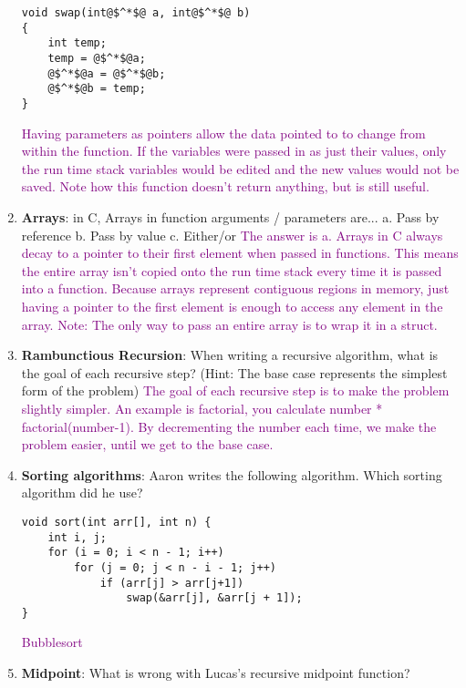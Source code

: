 \documentclass{article}
\begin{document}
\begin{enumerate}[label=(\alph*)]
    \begin{lstlisting}[style=CStyle]
void swap(int@$^*$@ a, int@$^*$@ b)
{
    int temp;
    temp = @$^*$@a;
    @$^*$@a = @$^*$@b;
    @$^*$@b = temp;
} \end{lstlisting}
\textcolor{purple}{Having parameters as pointers allow the data pointed to to change from within the function. If the variables were passed in as just their values, only the run time stack variables would be edited and the new values would not be saved. Note how this function doesn't return anything, but is still useful.
    }
\item \textbf{Arrays}: in C, Arrays in function arguments / parameters are...
\newline
a. Pass by reference 
\newline
b. Pass by value
\newline
c. Either/or
\newline
\textcolor{purple}{The answer is a. Arrays in C always decay to a pointer to their first element when passed in functions. This means the entire array isn't copied onto the run time stack every time it is passed into a function. Because arrays represent contiguous regions in memory, just having a pointer to the first element is enough to access any element in the array.
Note: The only way to pass an entire array is to wrap it in a struct.
    }
    \item \textbf{Rambunctious Recursion}: When writing a recursive algorithm, what is the goal of each recursive step? (Hint: The base case represents the simplest form of the problem)
    \newline\textcolor{purple}{The goal of each recursive step is to make the problem slightly simpler. An example is factorial, you calculate number * factorial(number-1). By decrementing the number each time, we make the problem easier, until we get to the base case.
    }
    \item \textbf{Sorting algorithms}: Aaron writes the following algorithm. Which sorting algorithm did he use?
\begin{lstlisting}[style=CStyle]
void sort(int arr[], int n) {
    int i, j;
    for (i = 0; i < n - 1; i++)
        for (j = 0; j < n - i - 1; j++)
            if (arr[j] > arr[j+1])
                swap(&arr[j], &arr[j + 1]);
}\end{lstlisting}
 \textcolor{purple}{Bubblesort}
 
        \item \textbf{Midpoint}: What is wrong with Lucas's  recursive midpoint function?
     

\end{enumerate}
\end{document}
